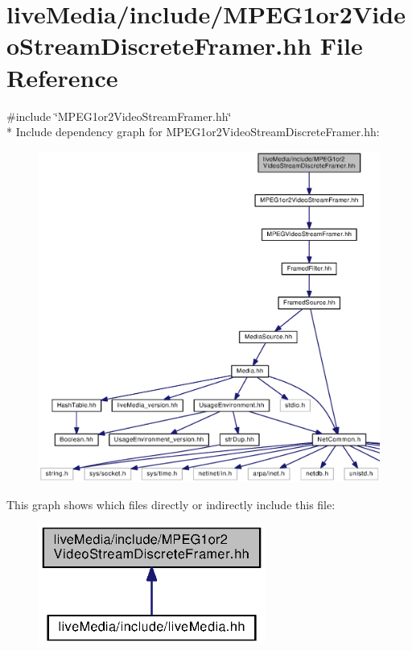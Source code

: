\section{live\+Media/include/\+M\+P\+E\+G1or2\+Video\+Stream\+Discrete\+Framer.hh File Reference}
\label{MPEG1or2VideoStreamDiscreteFramer_8hh}
{\ttfamily \#include \char`\"{}M\+P\+E\+G1or2\+Video\+Stream\+Framer.\+hh\char`\"{}}\\*
Include dependency graph for M\+P\+E\+G1or2\+Video\+Stream\+Discrete\+Framer.\+hh\+:
\nopagebreak
\begin{figure}[H]
\begin{center}
\leavevmode
\includegraphics[width=350pt]{MPEG1or2VideoStreamDiscreteFramer_8hh__incl}
\end{center}
\end{figure}
This graph shows which files directly or indirectly include this file\+:
\nopagebreak
\begin{figure}[H]
\begin{center}
\leavevmode
\includegraphics[width=211pt]{MPEG1or2VideoStreamDiscreteFramer_8hh__dep__incl}
\end{center}
\end{figure}
